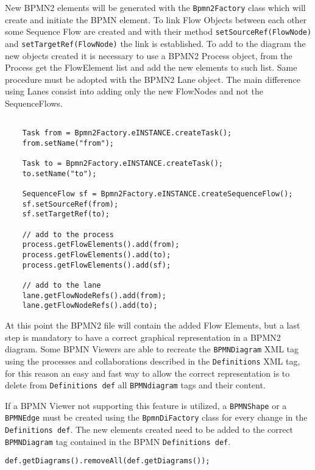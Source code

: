 New BPMN2 elements will be generated with the \texttt{Bpmn2Factory} class which will create and initiate the BPMN element. To link Flow Objects between each other some Sequence Flow are created and with their method \texttt{setSourceRef(FlowNode)} and \texttt{setTargetRef(FlowNode)} the link is established.
To add to the diagram the new objects created it is necessary to use a BPMN2 Process object, from the Process get the FlowElement list and add the new elements to such list. Same procedure must be adopted with the BPMN2 Lane object. The main difference using Lanes consist into adding only the new FlowNodes and not the SequenceFlows.

\begin{lstlisting}[caption=Example of the creation of new Tasks and SequenceFlows.]

	Task from = Bpmn2Factory.eINSTANCE.createTask();
	from.setName("from");

	Task to = Bpmn2Factory.eINSTANCE.createTask();
	to.setName("to");

	SequenceFlow sf = Bpmn2Factory.eINSTANCE.createSequenceFlow();
	sf.setSourceRef(from);
	sf.setTargetRef(to);

	// add to the process
	process.getFlowElements().add(from);
	process.getFlowElements().add(to);
	process.getFlowElements().add(sf);

	// add to the lane
	lane.getFlowNodeRefs().add(from);
	lane.getFlowNodeRefs().add(to);

\end{lstlisting}

At this point the BPMN2 file will contain the added Flow Elements, but a last step is mandatory to have a correct graphical representation in a BPMN2 diagram. 
Some BPMN Viewers are able to recreate the \texttt{BPMNDiagram} XML tag using the processes and collaborations described in the \texttt{Definitions} XML tag, for this reason an easy and fast way to allow the correct representation is to delete from \texttt{Definitions def} all \texttt{BPMNdiagram} tags and their content.

If a BPMN Viewer not supporting this feature is utilized, a \texttt{BPMNShape} or a \texttt{BPMNEdge} must be created using the \texttt{BpmnDiFactory} class for every change in the \texttt{Definitions def}. The new elements created need to be added to the correct \texttt{BPMNDiagram} tag contained in the BPMN \texttt{Definitions def}.

\begin{lstlisting}[caption=Remove all BPMNDiagram tags from the BPMNDefinitions.]
	def.getDiagrams().removeAll(def.getDiagrams());
\end{lstlisting}
